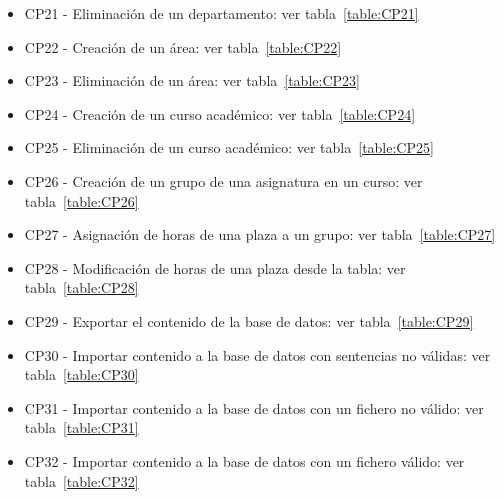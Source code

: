 \begin{itemize}
\item CP21 - Eliminación de un departamento: ver tabla~\ref{table:CP21}
\item CP22 - Creación de un área: ver tabla~\ref{table:CP22}
\item CP23 - Eliminación de un área: ver tabla~\ref{table:CP23}
\item CP24 - Creación de un curso académico: ver tabla~\ref{table:CP24}
\item CP25 - Eliminación de un curso académico: ver tabla~\ref{table:CP25}
\item CP26 - Creación de un grupo de una asignatura en un curso: ver tabla~\ref{table:CP26}
\item CP27 - Asignación de horas de una plaza a un grupo: ver tabla~\ref{table:CP27}
\item CP28 - Modificación de horas de una plaza desde la tabla: ver tabla~\ref{table:CP28}
\item CP29 - Exportar el contenido de la base de datos: ver tabla~\ref{table:CP29}
\item CP30 - Importar contenido a la base de datos con sentencias no válidas: ver tabla~\ref{table:CP30}
\item CP31 - Importar contenido a la base de datos con un fichero no válido: ver tabla~\ref{table:CP31}
\item CP32 - Importar contenido a la base de datos con un fichero válido: ver tabla~\ref{table:CP32}
\end{itemize}

